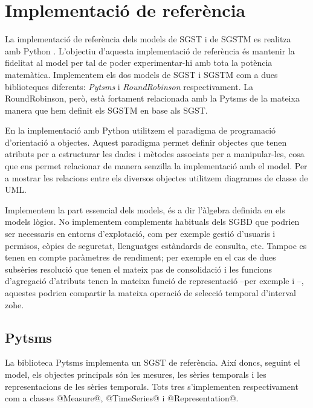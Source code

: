 

\chapter{Implementació de referència}
\label{sec:implementacio:python}


La implementació de referència dels models de \gls{SGST} i de \gls{SGSTM}
es realitza amb Python \parencite{python:doc2}. L'objectiu d'aquesta
implementació de referència és mantenir la fidelitat al model per tal
de poder experimentar-hi amb tota la potència matemàtica.
Implementem els dos models de \gls{SGST} i \gls{SGSTM} com a dues biblioteques
diferents: \emph{Pytsms} i \emph{RoundRobinson} respectivament. La
RoundRobinson, però, està fortament relacionada amb la
Pytsms de la mateixa manera que hem definit els \gls{SGSTM} en base
als \gls{SGST}.


En la implementació amb Python utilitzem el paradigma de programació
d'orientació a objectes. Aquest paradigma permet definir objectes que
tenen atributs per a estructurar les dades i mètodes associats per a
manipular-les, cosa que ens permet relacionar de manera senzilla la
implementació amb el model.  Per a mostrar les relacions entre els
diversos objectes utilitzem diagrames de classe de \gls{UML}.




Implementem la part essencial dels models, és a dir l'àlgebra definida
en els models lògics. No implementem complements habituals dels
\gls{SGBD} que podrien ser necessaris en entorns d'explotació, com per
exemple gestió d'usuaris i permisos, còpies de seguretat, llenguatges
estàndards de consulta, etc.  Tampoc es tenen en compte paràmetres de
rendiment; per exemple en el cas de dues subsèries resolució que tenen
el mateix pas de consolidació i les funcions d'agregació d'atributs
tenen la mateixa funció de representació --per exemple
 i --,
aquestes podrien compartir la mateixa operació de
selecció temporal d'interval \gls{zohe}.



\section{Pytsms}

La biblioteca Pytsms implementa un \gls{SGST} de referència. Així
doncs, seguint el model, els objectes principals són les mesures, les
sèries temporals i les representacions de les sèries temporals. Tots
tres s'implementen respectivament com a classes @Measure@,
@TimeSeries@ i @Representation@.


